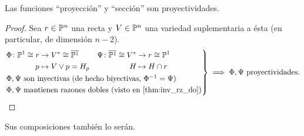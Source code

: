 \begin{col}
  Las funciones ``proyección'' y ``sección'' son proyectividades.
\end{col}
\begin{proof}
  Sea $r \in \mathbb{P}^n$ una recta y $V \in \mathbb{P}^n$ una variedad suplementaria a ésta
  (en particular, de dimensión $n-2$).
  \[
    \begin{rcases}
      \begin{aligned}
      \Phi \colon \mathbb{P}^1 \cong r &\to V^\ast \cong \overline{\mathbb{P}^1} \\ 
      p &\mapsto V \vee p = H_p
      \end{aligned}
      \quad
      \begin{aligned}
      \Psi \colon \overline{\mathbb{P}^1} \cong V^* &\to r \cong \mathbb{P}^1 \\ H &\mapsto H \cap r
      \end{aligned} \\
      \Phi, \Psi \text{ son inyectivas (de hecho biyectivas, } \Phi^{-1} = \Psi 
      \text{)}\\
      \Phi, \Psi \text{ mantienen razones dobles (visto en \ref{thm:inv_rz_do})}
  \end{rcases}
  \implies 
  \Phi, \Psi \text{ proyectividades.}
 \]
\end{proof}
  
\begin{obs}
  Sus composiciones también lo serán.
\end{obs}

